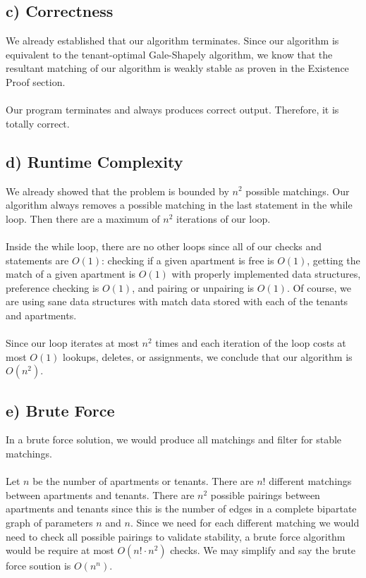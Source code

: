 \documentclass{article}
\begin{document}
\begin{algorithmic}
    \Else
        \EndIf
    \EndIf
\EndWhile
\end{algorithmic}


\subsection*{c) Correctness}
We already established that our algorithm terminates. Since our algorithm is
equivalent to the tenant-optimal Gale-Shapely algorithm, we know that the
resultant matching of our algorithm is weakly stable as proven in the
Existence Proof section. 
\\\\
Our program terminates and always produces correct output. Therefore, it is 
totally correct.


\subsection*{d) Runtime Complexity}
We already showed that the problem is bounded by $n^2$ possible matchings. Our
algorithm always removes a possible matching in the last statement in the
while loop. Then there are a maximum of $n^2$ iterations of our loop.
\\\\
Inside the while loop, there are no other loops since all of our checks and
statements are $O(1)$: checking if a given apartment is free is $O(1)$,
getting the match of a given apartment is $O(1)$ with properly implemented
data structures, preference checking is $O(1)$, and pairing or unpairing is
$O(1)$. Of course, we are using sane data structures with match data stored
with each of the tenants and apartments.
\\\\
Since our loop iterates at most $n^2$ times and each iteration of the loop
costs at most $O(1)$ lookups, deletes, or assignments, we conclude that our
algorithm is $O(n^2)$.


\subsection*{e) Brute Force}
In a brute force solution, we would produce all matchings and filter for
stable matchings.
\\\\
Let $n$ be the number of apartments or tenants. There are
$n!$ different matchings between apartments and tenants. There are $n^2$
possible pairings between apartments and tenants since this is the number of
edges in a complete bipartate graph of parameters $n$ and $n$. Since we need
for each different matching we would need to check all possible pairings to
validate stability, a brute force algorithm would be require at most
$O(n! \cdot n^2)$ checks. We may simplify and say the brute force soution is
$O(n^n)$.
\end{document}
